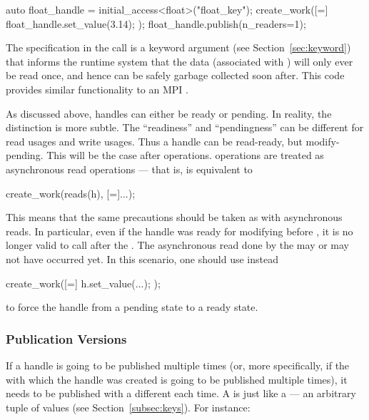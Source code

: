 \begin{CppCode}
auto float_handle = initial_access<float>("float_key");
create_work([=]{
  float_handle.set_value(3.14);
});
float_handle.publish(n_readers=1);
\end{CppCode}
The  specification in the  call is a
\gls{keyword argument} (see Section~\ref{sec:keyword}) that informs the
\gls{runtime system} that the data
(associated with ) will only ever be read once, and hence can be safely garbage collected soon after.  
This code provides similar functionality to an MPI .

As discussed above, \glspl{handle} can either be ready or pending. 
In reality, the distinction is more subtle. 
The ``readiness'' and ``pendingness'' can be different for read usages and write usages.
Thus a handle can be read-ready, but modify-pending.
This will be the case after  operations.
 operations are treated as asynchronous read operations --- that is,
 is equivalent to
\begin{CppCode}
create_work(reads(h), [=]{...});  
\end{CppCode}
This means that the same precautions should be taken as with asynchronous reads. 
In particular, even if the handle was ready for modifying before
, it is no longer valid to call 
after the .
The asynchronous read done by the  may or may not have occurred yet.  
In this scenario, one should use instead
\begin{CppCode}
create_work([=]{ h.set_value(...); });
\end{CppCode}
to force the \gls{handle} from a pending state to a ready state.

\subsubsection{Publication Versions}
If a \gls{handle} is going to be published multiple times (or, more specifically, if
the  with which the \gls{handle} was created is going to be published multiple
times), it needs to be published with a different  each time.  
A  is just like a  --- an arbitrary \gls{tuple} of values (see Section~\ref{subsec:keys}).  
For instance:

